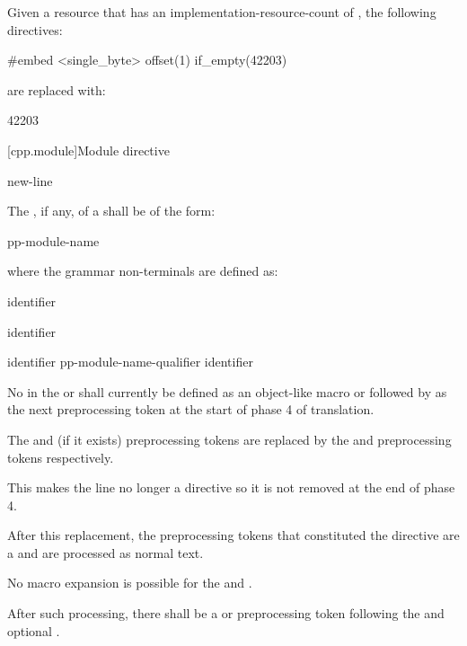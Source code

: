 \begin{example}
Given a resource 
that has an implementation-resource-count of ,
the following directives:
\begin{codeblock}
#embed <single_byte> offset(1) if_empty(42203)
\end{codeblock}
are replaced with:
\begin{codeblock}
42203
\end{codeblock}
\end{example}

[cpp.module]{Module directive}
%

\begin{bnf}
\br
       new-line
\end{bnf}

\pnum
The , if any, of a 
shall be of the form:
\begin{ncsimplebnf}
pp-module-name  
\end{ncsimplebnf}
where
the grammar non-terminals are defined as:
\begin{ncbnf}
\br
     identifier
\end{ncbnf}
\begin{ncbnf}
\br
    \terminal{:}  identifier
\end{ncbnf}
\begin{ncbnf}
\br
    identifier \br
    pp-module-name-qualifier identifier 
\end{ncbnf}
No  in
the  or 
shall currently be defined as an object-like macro
or followed by \tcode{(} as the next preprocessing token at
the start of phase 4 of translation.

\pnum
The  and  (if it exists) preprocessing tokens
are replaced by the  and
 preprocessing tokens respectively.
\begin{note}
This makes the line no longer a directive
so it is not removed at the end of phase 4.
\end{note}
After this replacement,
the preprocessing tokens that constituted the directive are
a  and are processed as normal text.
\begin{note}
No macro expansion is possible for
the  and .
\end{note}
After such processing,
there shall be a \tcode{;} or \tcode{[} preprocessing token following
the  and
optional .


